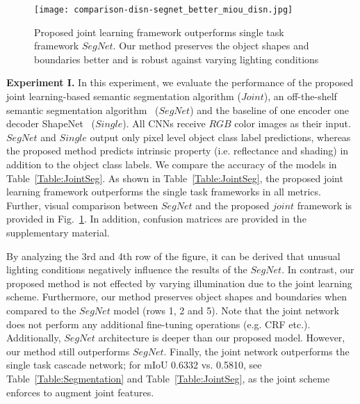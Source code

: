 \documentclass[runningheads]{llncs}
\begin{document}
\begin{figure}[t]
    \centering
    \texttt{[image: comparison-disn-segnet\_better\_miou\_disn.jpg]}
    \caption{Proposed joint learning framework outperforms single task framework $SegNet$. Our method preserves the object shapes and boundaries better and is robust against varying lighting conditions}
    \label{fig:segmentation}
\end{figure}

\noindent \textbf{Experiment I.} In this experiment, we evaluate the performance of the proposed joint learning-based semantic segmentation algorithm ($Joint$), an off-the-shelf semantic segmentation algorithm~\cite{segnet} ($SegNet$) and the baseline of one encoder one decoder ShapeNet~\cite{shi} ($Single$). All CNNs receive $RGB$ color images as their input. $SegNet$ and $Single$ output only pixel level object class label predictions, whereas the proposed method predicts intrinsic property (i.e. reflectance and shading) in addition to the object class labels. We compare the accuracy of the models in Table~\ref{Table:JointSeg}. As shown in Table~\ref{Table:JointSeg}, the proposed joint learning framework outperforms the single task frameworks in all metrics. Further, visual comparison between $SegNet$ and the proposed $joint$ framework is provided in Fig.~\ref{fig:segmentation}. In addition, confusion matrices are provided in the supplementary material.

\begin{table}[]
\centering
\caption{Comparison of the semantic segmentation accuracy. The proposed joint learning framework outperforms the single task frameworks in all metrics}
\label{Table:JointSeg}
\end{table}

\noindent By analyzing the 3rd and 4th row of the figure, it can be derived that unusual lighting conditions negatively influence the results of the $SegNet$. In contrast, our proposed method is not effected by varying illumination due to the joint learning scheme. Furthermore, our method preserves object shapes and boundaries when compared to the $SegNet$ model (rows 1, 2 and 5). Note that the joint network does not perform any additional fine-tuning operations (e.g. CRF etc.). Additionally, $SegNet$ architecture is deeper than our proposed model. However, our method still outperforms $SegNet$. Finally, the joint network outperforms the single task cascade network; for mIoU 0.6332 vs. 0.5810, see Table~\ref{Table:Segmentation} and Table~\ref{Table:JointSeg}, as the joint scheme enforces to augment joint features.
\end{document}
